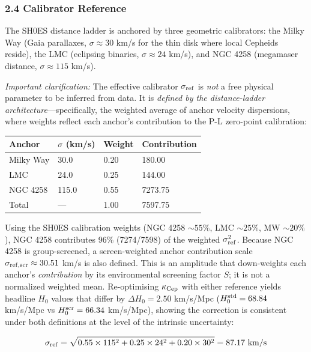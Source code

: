 \documentclass[
]{article}
\newcounter{none} %
\begin{document}
\subsubsection{2.4 Calibrator Reference}\label{calibrator-reference}

The SH0ES distance ladder is anchored by three geometric calibrators:
the Milky Way (Gaia parallaxes, \(\sigma \approx 30\) km/s for the thin
disk where local Cepheids reside), the LMC (eclipsing binaries,
\(\sigma \approx 24\) km/s), and NGC 4258 (megamaser distance,
\(\sigma \approx 115\) km/s).

\emph{Important clarification:} The effective calibrator \(\sigma_{\rm
ref}\) is \emph{not} a free physical parameter to be inferred from data.
It is \emph{defined by the distance-ladder architecture}---specifically,
the weighted average of anchor velocity dispersions, where weights
reflect each anchor's contribution to the P-L zero-point calibration:

{\def\LTcaptype{none} %
\begin{longtable}[]{@{}llll@{}}
\toprule\noalign{}
Anchor & \(\sigma\) (km/s) & Weight & Contribution \\
\midrule\noalign{}
\endhead
\bottomrule\noalign{}
\endlastfoot
Milky Way & 30.0 & 0.20 & 180.00 \\
LMC & 24.0 & 0.25 & 144.00 \\
NGC 4258 & 115.0 & 0.55 & 7273.75 \\
Total & --- & 1.00 & 7597.75 \\
\end{longtable}
}

Using the SH0ES calibration weights (NGC 4258 \(\sim 55\%\), LMC
\(\sim 25\%\), MW \(\sim 20\%\)), NGC 4258 contributes 96\% (7274/7598)
of the weighted \(\sigma_{\rm ref}^2\). Because NGC 4258 is
group-screened, a screen-weighted anchor contribution scale
\(\sigma_{\rm ref,scr} \approx 30.51\) km/s is also defined. This is an
amplitude that down-weights each anchor's \emph{contribution} by its
environmental screening factor \(S\); it is not a normalized weighted
mean. Re-optimising \(\kappa_{\rm Cep}\) with either reference yields
headline \(H_0\) values that differ by \(\Delta H_0 = 2.50\) km/s/Mpc
(\(H_0^{\rm std} = 68.84\) km/s/Mpc vs \(H_0^{\rm scr} = 66.34\)
km/s/Mpc), showing the correction is consistent under both definitions
at the level of the intrinsic uncertainty:

\begin{equation}
\sigma_{\rm ref} = \sqrt{0.55 \times 115^2 + 0.25 \times 24^2 + 0.20 \times 30^2} = 87.17 \text{ km/s}
\end{equation}
\end{document}
